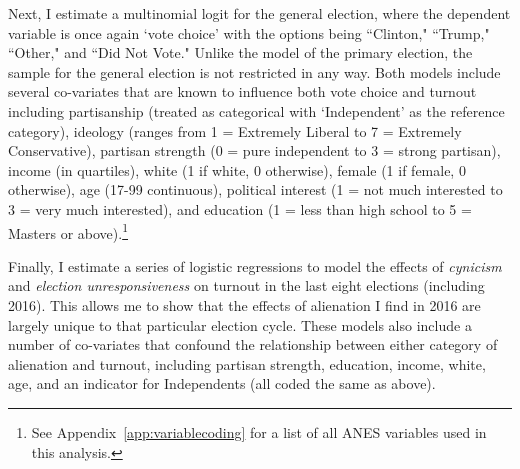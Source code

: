 \documentclass[12pt]{article}
\begin{document}
 Next, I estimate a multinomial logit for the general election, where the dependent variable is once again `vote choice' with the options being ``Clinton," ``Trump," ``Other," and ``Did Not Vote." Unlike the model of the primary election, the sample for the general election is not restricted in any way. Both models include several co-variates that are known to influence both vote choice and turnout including partisanship (treated as categorical with `Independent' as the reference category), ideology (ranges from 1 = Extremely Liberal to 7 = Extremely Conservative), partisan strength (0 = pure independent to 3 = strong partisan), income (in quartiles), white (1 if white, 0 otherwise), female (1 if female, 0 otherwise), age (17-99 continuous), political interest (1 = not much interested to 3 = very much interested), and education (1 = less than high school to 5 = Masters or above).\footnote{See Appendix~\ref{app:variablecoding} for a list of all ANES variables used in this analysis.}

Finally, I estimate a series of logistic regressions to model the effects of \textit{cynicism} and \textit{election unresponsiveness} on turnout in the last eight elections (including 2016). This allows me to show that the effects of alienation I find in 2016 are largely unique to that particular election cycle. These models also include a number of co-variates that confound the relationship between either category of alienation and turnout, including partisan strength, education, income, white, age, and an indicator for Independents (all coded the same as above). 










\end{document}
